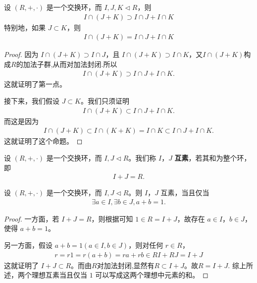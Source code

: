 \documentclass[../../main.tex]{subfiles}
\begin{document}
\begin{proposition}
设 $(R, +, \cdot)$ 是一个交换环，而 $I, J, K \lhd R$，则
\begin{align*}
I \cap (J + K) \supset I \cap J + I \cap K
\end{align*}
特别地，如果 $J \subset K$，则
\begin{align*}
I \cap (J + K) = I \cap J + I \cap K
\end{align*}
\end{proposition}
\begin{proof}
因为 $I \cap (J + K) \supset I \cap J$，且 $I \cap (J + K) \supset I \cap K$，又$I \cap (J + K)$构成$R$的加法子群,从而对加法封闭.所以
\begin{align*}
I \cap (J + K) \supset I \cap J + I \cap K.
\end{align*}
这就证明了第一点。

接下来，我们假设 $J \subset K$。我们只须证明
\begin{align*}
I \cap (J + K) \subset I \cap J + I \cap K.
\end{align*}
而这是因为
\begin{align*}
I \cap (J + K) \subset I \cap (K + K) = I \cap K \subset I \cap J + I \cap K.
\end{align*}
这就证明了这个命题。 
\end{proof}

\begin{definition}[理想的互素]
设 $(R, +, \cdot)$ 是一个交换环，而 $I, J \lhd R$。我们称 $I$，$J$ \textbf{互素}，若其和为整个环，即
\begin{align*}
I + J = R.
\end{align*}
\end{definition}

\begin{proposition}[两个理想互素的充要条件]\label{proposition:两个理想互素的充要条件}
设 $(R, +, \cdot)$ 是一个交换环，而 $I, J \lhd R$。则 $I$，$J$ 互素，当且仅当
\begin{align*}
\exists a \in I, \exists b \in J, a + b = 1.
\end{align*}
\end{proposition}
\begin{proof}
一方面，若 $I + J = R$，则根据可知 $1 \in R = I + J$，故存在 $a \in I$，$b \in J$，使得 $a + b = 1$。

另一方面，假设 $a + b = 1 (a \in I, b \in J)$，则对任何 $r \in R$，
\begin{align*}
r = r1 = r(a + b) = ra + rb \in RI + RJ = I + J
\end{align*}
这就证明了 $I + J \subset R$。而由$R$对加法封闭,显然有$R\subset I+J$。故$R=I+J.$
综上所述，两个理想互素当且仅当 $1$ 可以写成这两个理想中元素的和。
\end{proof}
\end{document}
